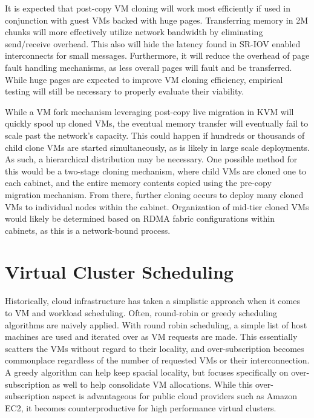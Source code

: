 It is expected that post-copy VM cloning will work most efficiently if used in conjunction with guest VMs backed with huge pages. Transferring memory in 2M chunks will more effectively utilize network bandwidth by eliminating send/receive overhead. This also will hide the latency found in SR-IOV enabled interconnects for small messages. Furthermore, it will reduce the overhead of page fault handling mechanisms, as less overall pages will fault and be transferred.  While huge pages are expected to improve VM cloning efficiency, empirical testing will still be necessary to properly evaluate their viability.   

While a VM fork mechanism leveraging post-copy live migration in KVM will quickly spool up cloned VMs, the eventual memory transfer will eventually fail to scale past the network's capacity. This could happen if hundreds or thousands of child clone VMs are started simultaneously, as is likely in large scale deployments. As such, a hierarchical distribution may be necessary. One possible method for this would be a two-stage cloning mechanism, where child VMs are cloned one to each cabinet, and the entire memory contents copied using the pre-copy migration mechanism. From there, further cloning occurs to deploy many cloned VMs to individual nodes within the cabinet. Organization of mid-tier cloned VMs would likely be determined based on RDMA fabric configurations within cabinets, as this is a network-bound process. 





\section{Virtual Cluster Scheduling}
\label{vcsched}


Historically, cloud infrastructure has taken a simplistic approach when it comes to VM and workload scheduling. Often, round-robin or greedy \cite{Younge2011eagc} scheduling algorithms are naively applied. With round robin scheduling, a simple list of host machines are used and iterated over as VM requests are made. This essentially scatters the VMs without regard to their locality, and over-subscription becomes commonplace regardless of the number of requested VMs or their interconnection. A greedy algorithm can help keep spacial locality, but focuses specifically on over-subscription as well to help consolidate VM allocations. While this over-subscription aspect is advantageous for public cloud providers such as Amazon EC2, it becomes counterproductive for high performance virtual clusters.

